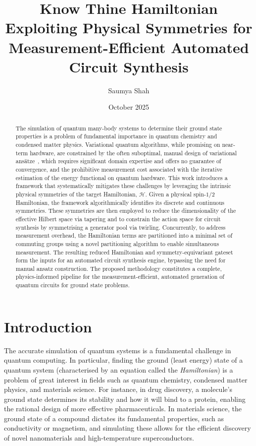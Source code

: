 \documentclass{article}
\title{Know Thine Hamiltonian\\\large Exploiting Physical Symmetries for Measurement-Efficient Automated Circuit Synthesis}
\author{Saumya Shah}
\date{October 2025}
\newcommand{\ham}{\mathcal{H}}
\newcommand{\ansatze}{ans\"atze~}
\begin{document}
\maketitle

\begin{abstract}
The simulation of quantum many-body systems to determine their ground state properties is a problem of fundamental importance in quantum chemistry and condensed matter physics. Variational quantum algorithms, while promising on near-term hardware, are constrained by the often suboptimal, manual design of variational \ansatze, which requires significant domain expertise and offers no guarantee of convergence, and the prohibitive measurement cost associated with the iterative estimation of the energy functional on quantum hardware. This work introduces a framework that systematically mitigates these challenges by leveraging the intrinsic physical symmetries of the target Hamiltonian, $\ham$. Given a physical spin-$1/2$ Hamiltonian, the framework algorithmically identifies its discrete and continuous symmetries. These symmetries are then employed to reduce the dimensionality of the effective Hilbert space via tapering and to constrain the action space for circuit synthesis by symmetrising a generator pool via twirling. Concurrently, to address measurement overhead, the Hamiltonian terms are partitioned into a minimal set of commuting groups using a novel partitioning algorithm to enable simultaneous measurement. The resulting reduced Hamiltonian and symmetry-equivariant gateset form the inputs for an automated circuit synthesis engine, bypassing the need for manual ansatz construction. The proposed methodology constitutes a complete, physics-informed pipeline for the measurement-efficient, automated generation of quantum circuits for ground state problems.
\end{abstract}

\section{Introduction}

The accurate simulation of quantum systems is a fundamental challenge in quantum computing.
In particular, finding the ground (least energy) state of a quantum system (characterised by an equation called the \emph{Hamiltonian}) is a problem of great interest in fields such as quantum chemistry, condensed matter physics, and materials science. 
For instance, in drug discovery, a molecule's ground state determines its stability and how it will bind to a protein, enabling the rational design of more effective pharmaceuticals. In materials science, the ground state of a compound 
dictates its fundamental properties, such as conductivity or magnetism, and simulating these allows for the efficient discovery of novel nanomaterials and high-temperature superconductors.
\end{document}
